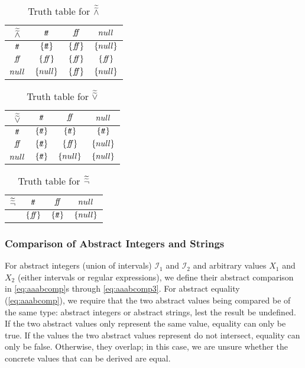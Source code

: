 \begin{table}[H]
    \centering
    \caption{Truth table for $\widetilde{\widetilde{\land}}$}
    \begin{tabular}{c|ccc}
        $\widetilde{\widetilde{\land}}$ & $t\!t$ & $f\!\!f$ & $null$ \\
        \hline
        $t\!t$ & $\{t\!t\}$ & $\{f\!\!f\}$ & $\{null\}$ \\
        $f\!\!f$ & $\{f\!\!f\}$ & $\{f\!\!f\}$ & $\{f\!\!f\}$ \\
        $null$ & $\{null\}$ & $\{f\!\!f\}$ & $\{null\}$ \\
    \end{tabular}
    \label{tab:aaabland}
\end{table}

\begin{table}[H]
    \centering
    \caption{Truth table for $\widetilde{\widetilde{\lor}}$}
    \begin{tabular}{c|ccc}
        $\widetilde{\widetilde{\lor}}$ & $t\!t$ & $f\!\!f$ & $null$ \\
        \hline
        $t\!t$ & $\{t\!t\}$ & $\{t\!t\}$ & $\{t\!t\}$ \\
        $f\!\!f$ & $\{t\!t\}$ & $\{f\!\!f\}$ & $\{null\}$ \\
        $null$ & $\{t\!t\}$ & $\{null\}$ & $\{null\}$ \\
    \end{tabular}
    \label{tab:aaablor}
\end{table}

\begin{table}[H]
    \centering
    \caption{Truth table for $\widetilde{\widetilde{\neg}}$}
    \begin{tabular}{c|ccc}
        $\widetilde{\widetilde{\neg}}$ & $t\!t$ & $f\!\!f$ & $null$ \\
        \hline
        & $\{f\!\!f\}$ & $\{t\!t\}$ & $\{null\}$ \\
    \end{tabular}
    \label{tab:aaabneg}
\end{table}

\subsubsection{Comparison of Abstract Integers and Strings}\label{subsubsec:abstract-comparison}
For abstract integers (union of intervals) $\mathscr{I}_1$ and $\mathscr{I}_2$ and arbitrary values $X_1$ and $X_2$ (either intervals or regular expressions), we define their abstract comparison in \autoref{eq:aaabcomp}s through \ref{eq:aaabcomp3}.
For abstract equality (\autoref{eq:aaabcomp}), we require that the two abstract values being compared be of the same type: abstract integers or abstract strings, lest the result be undefined.
If the two abstract values only represent the same value, equality can only be true.
If the values the two abstract values represent do not intersect, equality can only be false.
Otherwise, they overlap; in this case, we are unsure whether the concrete values that can be derived are equal.

